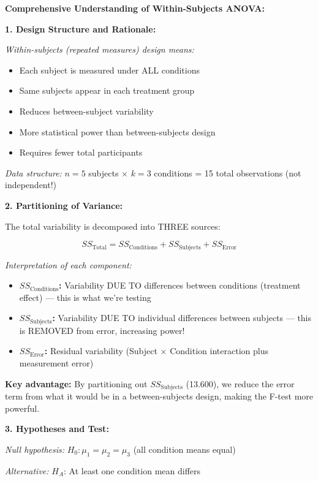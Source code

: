 \documentclass[12pt]{article}
\begin{document}
\begin{explanation}
\textbf{Comprehensive Understanding of Within-Subjects ANOVA:}

\textbf{1. Design Structure and Rationale:}

\textit{Within-subjects (repeated measures) design means:}
\begin{itemize}
\item Each subject is measured under ALL conditions
\item Same subjects appear in each treatment group
\item Reduces between-subject variability
\item More statistical power than between-subjects design
\item Requires fewer total participants
\end{itemize}

\textit{Data structure:} $n = 5$ subjects $\times$ $k = 3$ conditions = 15 total observations (not independent!)

\textbf{2. Partitioning of Variance:}

The total variability is decomposed into THREE sources:

\[
SS_{\text{Total}} = SS_{\text{Conditions}} + SS_{\text{Subjects}} + SS_{\text{Error}}
\]

\textit{Interpretation of each component:}

\begin{itemize}
\item \textbf{$SS_{\text{Conditions}}$:} Variability DUE TO differences between conditions (treatment effect) — this is what we're testing
\item \textbf{$SS_{\text{Subjects}}$:} Variability DUE TO individual differences between subjects — this is REMOVED from error, increasing power!
\item \textbf{$SS_{\text{Error}}$:} Residual variability (Subject $\times$ Condition interaction plus measurement error)
\end{itemize}

\textbf{Key advantage:} By partitioning out $SS_{\text{Subjects}}$ (13.600), we reduce the error term from what it would be in a between-subjects design, making the F-test more powerful.

\textbf{3. Hypotheses and Test:}

\textit{Null hypothesis:} $H_0: \mu_1 = \mu_2 = \mu_3$ (all condition means equal)

\textit{Alternative:} $H_A$: At least one condition mean differs


\end{explanation}
\end{document}
